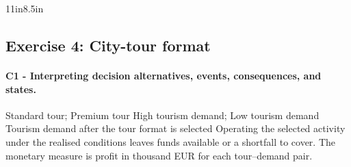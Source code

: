 \begin{CalculationLandscape}{11in}{8.5in}
	\begingroup\renewcommand{\CalculationStateCount}{2}
\endgroup
\end{CalculationLandscape}

	
	\newpage
	\subsection{Exercise 4: City-tour format}
	\label{sec:problem4-city-tour-format-c1-c2}
	
	\paragraph*{C1 - Interpreting decision alternatives, events, consequences, and states.}
	\label{subsec:problem4-city-tour-format-c1}
	\DecisionElementsTable
{Standard tour; Premium tour}
{High tourism demand; Low tourism demand}
{Tourism demand after the tour format is selected}
{Operating the selected activity under the realised conditions leaves funds available or a shortfall to cover. The monetary measure is profit in thousand EUR for each tour--demand pair.}

	
	
